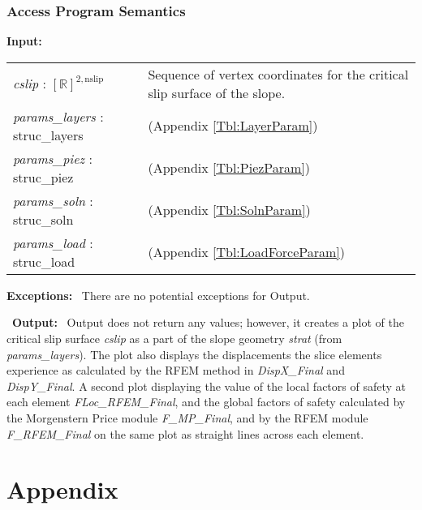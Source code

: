 \documentclass[12pt]{article}
\begin{document}
\subsubsection{Access Program Semantics}
\textbf{Input:}
\renewcommand*{\arraystretch}{1.5}
\begin{longtable}{p{} p{}}
  \textit{cslip} : $[\mathbb{R}]^{2,\text{nslip}}$ & Sequence of
  vertex coordinates for the critical slip surface of the slope. \\
  
  \textit{params\_layers} : struc\_layers & (Appendix \ref{Tbl:LayerParam})\\
  
  \textit{params\_piez} : struc\_piez & (Appendix \ref{Tbl:PiezParam})\\

  \textit{params\_soln} : struc\_soln & (Appendix \ref{Tbl:SolnParam})\\
  
  \textit{params\_load} : struc\_load & (Appendix
  \ref{Tbl:LoadForceParam})\\
\end{longtable}

\noindent \textbf{Exceptions:} ~\newline\noindent There are no
potential exceptions for Output.

~\newline\noindent \textbf{Output:} ~\newline\noindent Output does not
return any values; however, it creates a plot of the critical slip
surface \textit{cslip} as a part of the slope geometry \textit{strat}
(from \textit{params\_layers}). The plot also displays the
displacements the slice elements experience as calculated by the RFEM
method in \textit{DispX\_Final} and \textit{DispY\_Final}. A second
plot displaying the value of the local factors of safety at each
element \textit{FLoc\_RFEM\_Final}, and the global factors of safety
calculated by the Morgenstern Price module \textit{F\_MP\_Final}, and
by the RFEM module \textit{F\_RFEM\_Final} on the same plot as
straight lines across each element.

\section{Appendix}
\end{document}
